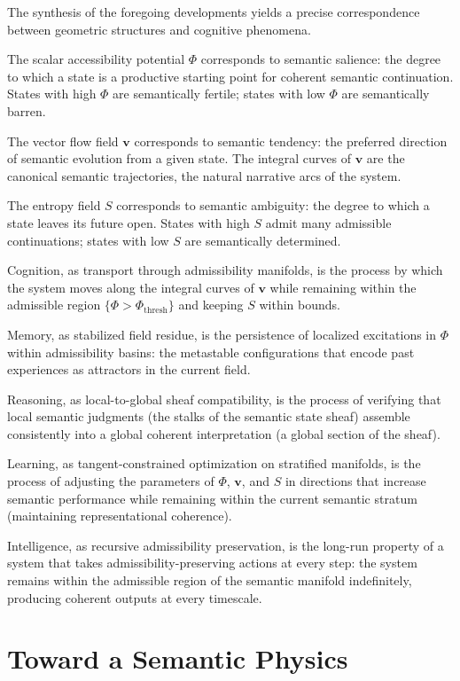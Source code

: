 \documentclass[12pt, a4paper, openany]{book}
\theoremstyle{plain}
\theoremstyle{definition}
\theoremstyle{remark}
\newcommand{\vvec}{\mathbf{v}}
\newcommand{\Sfield}{S}
\begin{document}
The synthesis of the foregoing developments yields a precise correspondence between geometric structures and cognitive phenomena.

The scalar accessibility potential $\Phi$ corresponds to semantic salience: the degree to which a state is a productive starting point for coherent semantic continuation. States with high $\Phi$ are semantically fertile; states with low $\Phi$ are semantically barren.

The vector flow field $\vvec$ corresponds to semantic tendency: the preferred direction of semantic evolution from a given state. The integral curves of $\vvec$ are the canonical semantic trajectories, the natural narrative arcs of the system.

The entropy field $\Sfield$ corresponds to semantic ambiguity: the degree to which a state leaves its future open. States with high $\Sfield$ admit many admissible continuations; states with low $\Sfield$ are semantically determined.

Cognition, as transport through admissibility manifolds, is the process by which the system moves along the integral curves of $\vvec$ while remaining within the admissible region $\{\Phi > \Phi_{\mathrm{thresh}}\}$ and keeping $\Sfield$ within bounds.

Memory, as stabilized field residue, is the persistence of localized excitations in $\Phi$ within admissibility basins: the metastable configurations that encode past experiences as attractors in the current field.

Reasoning, as local-to-global sheaf compatibility, is the process of verifying that local semantic judgments (the stalks of the semantic state sheaf) assemble consistently into a global coherent interpretation (a global section of the sheaf).

Learning, as tangent-constrained optimization on stratified manifolds, is the process of adjusting the parameters of $\Phi$, $\vvec$, and $\Sfield$ in directions that increase semantic performance while remaining within the current semantic stratum (maintaining representational coherence).

Intelligence, as recursive admissibility preservation, is the long-run property of a system that takes admissibility-preserving actions at every step: the system remains within the admissible region of the semantic manifold indefinitely, producing coherent outputs at every timescale.

\section{Toward a Semantic Physics}
\end{document}
